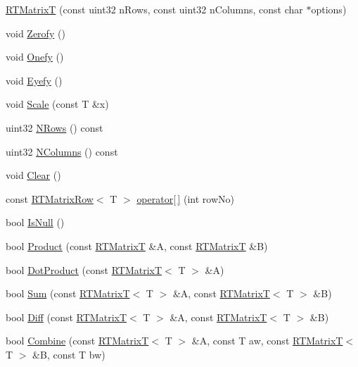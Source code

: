 \begin{DoxyCompactItemize}
\item 
\hyperlink{classRTMatrixT_a469d1e9a31a9e81be88464ab444a0a54}{RTMatrixT} (const uint32 nRows, const uint32 nColumns, const char $\ast$options)
\item 
void \hyperlink{classRTMatrixT_ab792ff0825d8c67a79c23b051ee70367}{Zerofy} ()
\item 
void \hyperlink{classRTMatrixT_af16471905a590114f6b560fb14b41350}{Onefy} ()
\item 
void \hyperlink{classRTMatrixT_a2bc71bcbbc5ede802b23620a543f5762}{Eyefy} ()
\item 
void \hyperlink{classRTMatrixT_a1319919a5212715705ff30a4155e1327}{Scale} (const T \&x)
\item 
uint32 \hyperlink{classRTMatrixT_a38179933093473554555dcdfb035e8ce}{NRows} () const 
\item 
uint32 \hyperlink{classRTMatrixT_a2fcc0950e8b0d4c8d00c92aa8a99d59c}{NColumns} () const 
\item 
void \hyperlink{classRTMatrixT_a234c8e2022252db0ff7f9f1a68fb47de}{Clear} ()
\item 
const \hyperlink{classRTMatrixRow}{RTMatrixRow}$<$ T $>$ \hyperlink{classRTMatrixT_afd251c8826e3350e7d2cbdf98a15af2c}{operator\mbox{[}$\,$\mbox{]}} (int rowNo)
\item 
bool \hyperlink{classRTMatrixT_a32bca77e2956ac200c9d8b5b62a93394}{IsNull} ()
\item 
bool \hyperlink{classRTMatrixT_afb183a86036303dba36e56eac881fa38}{Product} (const \hyperlink{classRTMatrixT}{RTMatrixT} \&A, const \hyperlink{classRTMatrixT}{RTMatrixT} \&B)
\item 
bool \hyperlink{classRTMatrixT_ad0ef2110e91e93440f1574567a498419}{DotProduct} (const \hyperlink{classRTMatrixT}{RTMatrixT}$<$ T $>$ \&A)
\item 
bool \hyperlink{classRTMatrixT_af866c8313cb58740b7a4a99665d8aa71}{Sum} (const \hyperlink{classRTMatrixT}{RTMatrixT}$<$ T $>$ \&A, const \hyperlink{classRTMatrixT}{RTMatrixT}$<$ T $>$ \&B)
\item 
bool \hyperlink{classRTMatrixT_a07f4045c3ce877cde806294a336568b2}{Diff} (const \hyperlink{classRTMatrixT}{RTMatrixT}$<$ T $>$ \&A, const \hyperlink{classRTMatrixT}{RTMatrixT}$<$ T $>$ \&B)
\item 
bool \hyperlink{classRTMatrixT_afb66d6eacc34946de4c9470fae15bfcf}{Combine} (const \hyperlink{classRTMatrixT}{RTMatrixT}$<$ T $>$ \&A, const T aw, const \hyperlink{classRTMatrixT}{RTMatrixT}$<$ T $>$ \&B, const T bw)
\item 

\end{DoxyCompactItemize}
